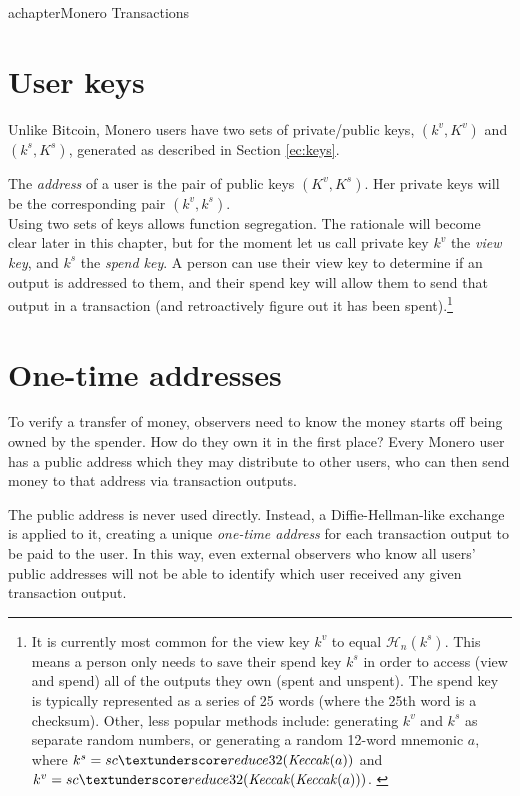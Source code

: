 achapter{Monero Transactions}
\label{chapter:transactions}

\section{User keys}
\label{sec:user-keys}

Unlike Bitcoin, Monero users have two sets of private/public keys, \((k^v, K^v)\) and \( (k^s, K^s) \), generated as described in Section \ref{ec:keys}.

The {\em address} of a user is the pair of public keys \((K^v, K^s)\). Her private keys will be the corresponding pair \( (k^v, k^s) \).
\\

Using two sets of keys allows function segregation. The rationale will become clear later in this chapter, but for the moment let us call private key $k^v$ the {\em view key}, and $k^s$ the {\em spend key}. A person can use their view key to determine if an output is addressed to them, and their spend key will allow them to send that output in a transaction (and retroactively figure out it has been spent).\footnote{It is currently most common for the view key $k^v$ to equal $\mathcal{H}_n(k^s)$. This means a person only needs to save their spend key $k^s$ in order to access (view and spend) all of the outputs they own (spent and unspent). The spend key is typically represented as a series of 25 words (where the 25th word is a checksum). Other, less popular methods include: generating $k^v$ and $k^s$ as separate random numbers, or generating a random 12-word mnemonic $a$, where $k^s = sc\textunderscore reduce32(\mathit{Keccak}(a))$ and $k^v = sc\textunderscore reduce32(\mathit{Keccak}(\mathit{Keccak}(a)))$. \cite{luigi-address}}



\section{One-time addresses}
\label{sec:one-time-addresses}

To verify a transfer of money, observers need to know the money starts off being owned by the spender. How do they own it in the first place? Every Monero user has a public address which they may distribute to other users, who can then send money to that address via transaction outputs. 

The public address is never used directly. Instead, a Diffie-Hellman-like exchange is applied to it, creating a unique {\em one-time address} for each transaction output to be paid to the user. In this way, even external observers who know all users’ public addresses will not be able to identify which user received any given transaction output.

